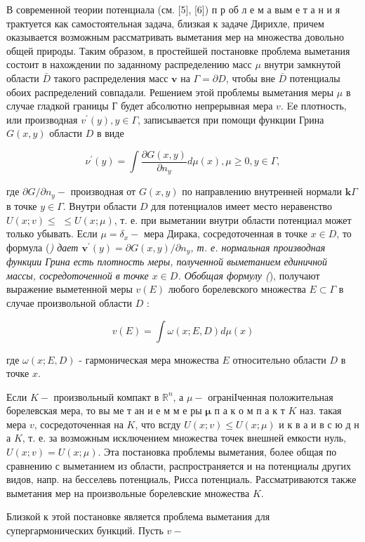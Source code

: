 \documentclass[10pt]{article}
\begin{document}
В современной теории потенциала (см. [5], [6]) п р об л е м а вым е т а н и я трактуется как самостоятельная задача, близкая к задаче Дирихле, причем оказывается возможным рассматривать выметания мер на множества довольно общей природы. Таким образом, в простейшей постановке проблема выметания состоит в нахождении по заданному распределению масс $\mu$ внутри замкнутой области $\bar{D}$ такого распределения масс $\boldsymbol{v}$ на $\Gamma=\partial D$, чтобы вне $\bar{D}$ потенциалы обоих распределений совпадали. Решением этой проблемы выметания меры $\mu$ в случае гладкой границы Г будет абсолютно непрерывная мера $v$. Eе плотность, или производная $v^{\prime}(y), y \in \Gamma$, записывается при помощи функции Грина $G(x, y)$ области $D$ в виде



\[

\nu^{\prime}(y)=\int \frac{\partial G(x, y)}{\partial n_{y}} d \mu(x), \mu \geqslant 0, y \in \Gamma,

\]



где $\partial G / \partial n_{y}-$ производная от $G(x, y)$ по направлению внутренней нормали $\boldsymbol{k} \Gamma$ в точке $y \in \Gamma$. Внутри области $D$ для потенциалов имеет место неравенство $U(x ; v) \leqslant$ $\leqslant U(x ; \mu)$, т. е. при выметании внутри области потенциал может только убывать. Если $\mu=\delta_{x}-$ мера Дирака, сосредоточенная в точке $x \in D$, то формула (\textit{) дает $\boldsymbol{v}^{\prime}(y)=\partial G(x, y) / \partial n_{y}$, т. е. нормальная производная функции Грина есть плотность меры, полученной выметанием единичной массы, сосредоточенной в точке $x \in D$. Обобщая формулу (}), получают выражение выметенной меры $v(E)$ любого борелевского множества $E \subset \Gamma$ в случае произвольной области $D$ :



\[

v(E)=\int \omega(x ; E, D) d \mu(x)

\]



где $\omega(x ; E, D)$ - гармоническая мера множества $E$ относительно области $D$ в точке $x$.



Если $K-$ произвольный компакт в $\mathbb{R}^{n}$, а $\mu-$ ограніІченная положительная борелевская мера, то вы ме т ан и е м м е ры $\boldsymbol{\mu}$ п а к о м п а к т $K$ наз. такая мера $v$, сосредоточенная на $K$, что всгду $U(x ; v) \leqslant U(x ; \mu)$ и к в а и в с ю д н а $K$, т. е. за возможным исключением множества точек внешней емкости нуль, $U(x ; v)=U(x ; \mu)$. Эта постановка проблемы выметания, более общая по сравнению с выметанием из области, распространяется и на потенциалы других видов, напр. на бесселевь потенциаль, Рисса потенциаль. Рассматриваются также выметания мер на произвольные борелевские множества $K$.



Близкой к этой постановке является проблема выметания для супергармонических бункций. Пусть $v-$
\end{document}
